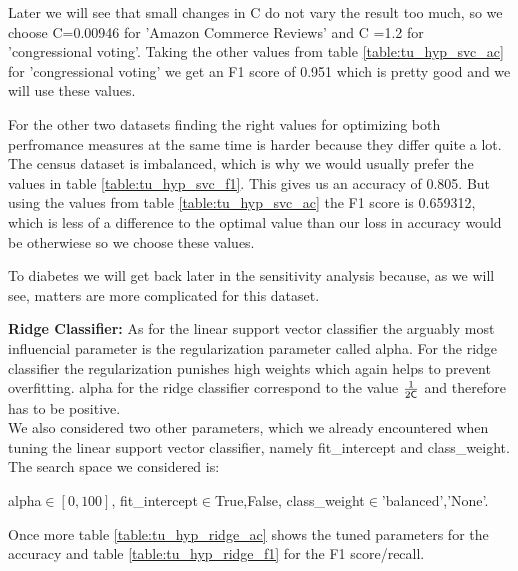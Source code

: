 \documentclass[a4paper,12pt]{article}
\begin{document}
Later we will see that small changes in \textsf{C} do not vary the result too much, so we choose \textsf{C}=0.00946 for 'Amazon Commerce Reviews' and \textsf{C} =1.2 for 'congressional voting'. Taking the other values from table \ref{table:tu_hyp_svc_ac} for 'congressional voting' we get an F1 score of 0.951 which is pretty good and we will use these values.

For the other two datasets finding the right values for optimizing both perfromance measures at the same time is harder because they differ quite a lot. The census dataset is imbalanced, which is why we would usually prefer the values in table \ref{table:tu_hyp_svc_f1}. This gives us an accuracy of 0.805. But using the values from table \ref{table:tu_hyp_svc_ac} the F1 score is 0.659312, which is less of a difference to the optimal value than our loss in accuracy would be otherwiese so we choose these values.

To diabetes we will get back later in the sensitivity analysis because, as we will see, matters are more complicated for this dataset.

\textbf{Ridge Classifier:}
As for the linear support vector classifier the arguably most influencial parameter is the regularization parameter called \textsf{alpha}. For the ridge classifier the regularization punishes high weights which again helps to prevent overfitting. \textsf{alpha} for the ridge classifier correspond to the value \(\frac{1}{2 \text{\textsf{C}}}\) and therefore has to be positive.\\
We also considered two other parameters, which we already encountered when tuning the linear support vector classifier, namely \textsf{fit\_intercept} and \textsf{class\_weight}. The search space we considered is:
\begin{center}
    \textsf{alpha}\(\in[0,100]\), \textsf{fit\_intercept}\(\in\){True,False}, \textsf{class\_weight}\(\in\){'balanced','None'}.
\end{center}

Once more table \ref{table:tu_hyp_ridge_ac} shows the tuned parameters for the accuracy and table \ref{table:tu_hyp_ridge_f1} for the F1 score/recall.
\end{document}
